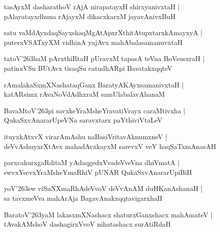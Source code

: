 \documentclass[twoside,12pt,openright]{book}
\def\S{\char'263}
\newcounter{shloka}[chapter]
\begin{document}
\begin{shloka}%
tasAyxM dasharathoV rAjA nirapatayxH shirxyanivxtaH |\\
pAlayatayxdhuna rAjayxM dikacxkarxM jayavAnivxBuH
\end{shloka}

\begin{shloka}%
satu vaMdAyxdaqSayxshaqMgAtApxrXthitAtupxtarxkAmayxyA |\\
puterxVSATxyXM vidhinA yajAvx mahAbalasamanuvxtaH
\end{shloka}

\begin{shloka}%
tatoV\S haM pArxthiRtaH pUravxM tapasA teVna BoVsusxraH |\\
patinxVSu BUtAvx tisaqSu catudhARpi BavatakxqqteV
\end{shloka}

\begin{shloka}%
rAmalakaSxmXNashataqGanx BaratyAKAyxsamanivxtaH |\\
katARsimx rAvaNoVdAdhxraM samUlabalavAhanaM 
\end{shloka}

\begin{shloka}%
BavaMtoV\S pi savxkeYraMsheYravatiVrayx caraMtivxha |\\
QukaSxvAnararUpeVNa saravxtarx paYthiviVtaLeV
\end{shloka}

\begin{shloka}%
ituyxkAtxvX virarAmAshu naBasiVritavAknumxneV |\\
deVvAshuyxrXtAvx mahadAvxkayxM sarevxV veY haqSaTxmAnasAH
\end{shloka}

\begin{shloka}%
parxcakurxgaRditaM yAdaqgedxVvadeVveVna dhiVmatA |\\
swvxYsevxYraMsheYmaRhiV pUNAR QukaSxvAnararUpiBiH
\end{shloka}

\begin{shloka}%
yoV\S sw viSuNXmaRhAdeVvoV deVvAnAM duHKanAshanaH |\\
sa tavxmeVva mahArAja BagavAnakxqqtavigarxhaH 
\end{shloka}

\begin{shloka}%
BaratoV\S yaM lakasxmXNashacx shaturxGanxshacx mahAmateV |\\
tAvakAMshoV dashagirxVvoV nihatashacx surAtiRdaH 
\end{shloka}
\end{document}
